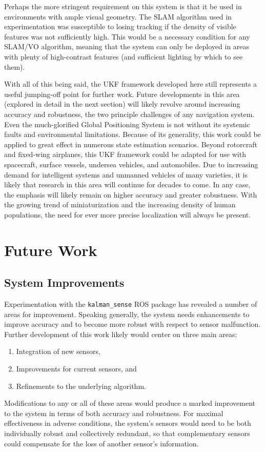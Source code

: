 Perhaps the more stringent requirement on this system is that it be used in environments with ample visual geometry. The SLAM algorithm used in experimentation was susceptible to losing tracking if the density of visible features was not sufficiently high. This would be a necessary condition for any SLAM/VO algorithm, meaning that the system can only be deployed in areas with plenty of high-contrast features (and sufficient lighting by which to see them).

With all of this being said, the UKF framework developed here still represents a useful jumping-off point for further work. Future developments in this area (explored in detail in the next section) will likely revolve around increasing accuracy and robustness, the two principle challenges of any navigation system. Even the much-glorified Global Positioning System is not without its systemic faults and environmental limitations. Because of its generality, this work could be applied to great effect in numerous state estimation scenarios. Beyond rotorcraft and fixed-wing airplanes, this UKF framework could be adapted for use with spacecraft, surface vessels, undersea vehicles, and automobiles. Due to increasing demand for intelligent systems and unmanned vehicles of many varieties, it is likely that research in this area will continue for decades to come. In any case, the emphasis will likely remain on higher accuracy and greater robustness. With the growing trend of miniaturization and the increasing density of human populations, the need for ever more precise localization will always be present.

\section{Future Work}

\subsection{System Improvements}

Experimentation with the \texttt{kalman\_sense} ROS package has revealed a number of areas for improvement. Speaking generally, the system needs enhancements to improve accuracy and to become more robust with respect to sensor malfunction. Further development of this work likely would center on three main areas:
\begin{enumerate}
    \item Integration of new sensors,
    \item Improvements for current sensors, and
    \item Refinements to the underlying algorithm.
\end{enumerate}
Modifications to any or all of these areas would produce a marked improvement to the system in terms of both accuracy and robustness. For maximal effectiveness in adverse conditions, the system's sensors would need to be both individually robust and collectively redundant, so that complementary sensors could compensate for the loss of another sensor's information.

